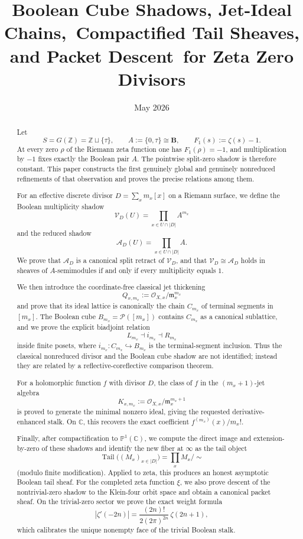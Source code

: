 \documentclass[11pt,a4paper]{article}
\title{Boolean Cube Shadows, Jet-Ideal Chains,\
Compactified Tail Sheaves, and Packet Descent\
for Zeta Zero Divisors}
\author{}
\date{May 2026}
\theoremstyle{definition}
\theoremstyle{remark}
\DeclareMathOperator{\Tail}{Tail}
\newcommand{\ZZ}{\mathbb Z}
\newcommand{\CC}{\mathbb C}
\newcommand{\PP}{\mathbb P}
\newcommand{\BB}{\mathbf B}
\newcommand{\cO}{\mathcal O}
\newcommand{\cP}{\mathcal P}
\newcommand{\cV}{\mathcal V}
\newcommand{\cA}{\mathcal A}
\newcommand{\taup}{\tau}
\newcommand{\into}{\hookrightarrow}
\begin{document}
\maketitle

\begin{abstract}
Let
\[
S=G(\ZZ)=\ZZ\sqcup\{\taup\},\qquad A:=\{0,\taup\}\cong\BB,
\qquad F_1(s):=\zeta(s)-1.
\]
At every zero $\rho$ of the Riemann zeta function one has $F_1(\rho)=-1$, and multiplication by $-1$ fixes exactly the Boolean pair $A$.  The pointwise split-zero shadow is therefore constant.  This paper constructs the first genuinely global and genuinely nonreduced refinements of that observation and proves the precise relations among them.

For an effective discrete divisor $D=\sum_x m_x[x]$ on a Riemann surface, we define the Boolean multiplicity shadow
\[
\cV_D(U)=\prod_{x\in U\cap |D|}A^{m_x}
\]
and the reduced shadow
\[
\cA_D(U)=\prod_{x\in U\cap |D|}A.
\]
We prove that $\cA_D$ is a canonical split retract of $\cV_D$, and that $\cV_D\cong\cA_D$ holds in sheaves of $A$-semimodules if and only if every multiplicity equals $1$.

We then introduce the coordinate-free classical jet thickening
\[
Q_{x,m_x}:=\cO_{X,x}/\mathfrak m_x^{m_x}
\]
and prove that its ideal lattice is canonically the chain $C_{m_x}$ of terminal segments in $[m_x]$.  The Boolean cube $B_{m_x}=\cP([m_x])$ contains $C_{m_x}$ as a canonical sublattice, and we prove the explicit biadjoint relation
\[
L_{m_x}\dashv i_{m_x}\dashv R_{m_x}
\]
inside finite posets, where $i_{m_x}:C_{m_x}\into B_{m_x}$ is the terminal-segment inclusion.  Thus the classical nonreduced divisor and the Boolean cube shadow are not identified; instead they are related by a reflective-coreflective comparison theorem.

For a holomorphic function $f$ with divisor $D$, the class of $f$ in the $(m_x+1)$-jet algebra
\[
K_{x,m_x}:=\cO_{X,x}/\mathfrak m_x^{m_x+1}
\]
is proved to generate the minimal nonzero ideal, giving the requested derivative-enhanced stalk.  On $\CC$, this recovers the exact coefficient $f^{(m_x)}(x)/m_x!$.

Finally, after compactification to $\PP^1(\CC)$, we compute the direct image and extension-by-zero of these shadows and identify the new fiber at $\infty$ as the tail object
\[
\Tail\bigl((M_x)_{x\in |D|}\bigr)=\prod_x M_x\Big/\sim
\]
(modulo finite modification).  Applied to zeta, this produces an honest asymptotic Boolean tail sheaf.  For the completed zeta function $\xi$, we also prove descent of the nontrivial-zero shadow to the Klein-four orbit space and obtain a canonical packet sheaf.  On the trivial-zero sector we prove the exact weight formula
\[
|\zeta'(-2n)|=\frac{(2n)!}{2(2\pi)^{2n}}\,\zeta(2n+1),
\]
which calibrates the unique nonempty face of the trivial Boolean stalk.
\end{abstract}
\end{document}
